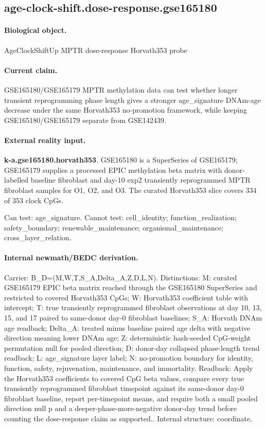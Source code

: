\subsection{age-clock-shift.dose-response.gse165180}

\paragraph{Biological object.} AgeClockShiftUp MPTR dose-response Horvath353 probe

\paragraph{Current claim.} GSE165180/GSE165179 MPTR methylation data can test whether longer transient reprogramming phase length gives a stronger age\_signature DNAm-age decrease under the same Horvath353 no-promotion framework, while keeping GSE165180/GSE165179 separate from GSE142439.

\paragraph{External reality input.}
\textbf{k-a.gse165180.horvath353}. GSE165180 is a SuperSeries of GSE165179; GSE165179 supplies a processed EPIC methylation beta matrix with donor-labelled baseline fibroblast and day-10 exp2 transiently reprogrammed MPTR fibroblast samples for O1, O2, and O3. The curated Horvath353 slice covers 334 of 353 clock CpGs.

Can test: age\_signature. Cannot test: cell\_identity; function\_realization; safety\_boundary; renewable\_maintenance; organismal\_maintenance; cross\_layer\_relation.

\paragraph{Internal newmath/BEDC derivation.} Carrier: B\_D=(M,W,T,S\_A,Delta\_A,Z,D,L,N). Distinctions: M: curated GSE165179 EPIC beta matrix reached through the GSE165180 SuperSeries and restricted to covered Horvath353 CpGs; W: Horvath353 coefficient table with intercept; T: true transiently reprogrammed fibroblast observations at day 10, 13, 15, and 17 paired to same-donor day-0 fibroblast baselines; S\_A: Horvath DNAm age readback; Delta\_A: treated minus baseline paired age delta with negative direction meaning lower DNAm age; Z: deterministic hash-seeded CpG-weight permutation null for pooled direction; D: donor-day collapsed phase-length trend readback; L: age\_signature layer label; N: no-promotion boundary for identity, function, safety, rejuvenation, maintenance, and immortality. Readback: Apply the Horvath353 coefficients to covered CpG beta values, compare every true transiently reprogrammed fibroblast timepoint against its same-donor day-0 fibroblast baseline, report per-timepoint means, and require both a small pooled direction null p and a deeper-phase-more-negative donor-day trend before counting the dose-response claim as supported.. Internal structure: coordinate.

